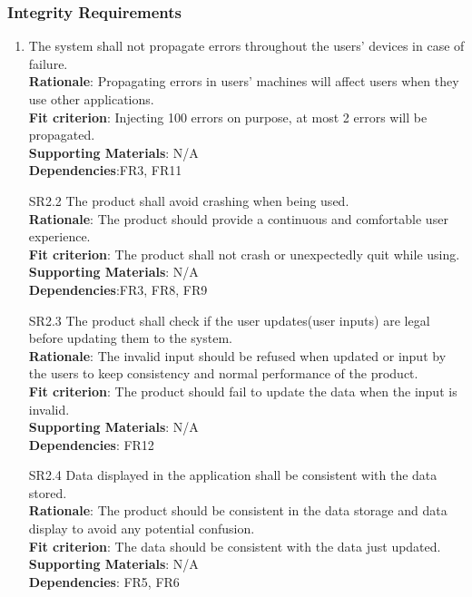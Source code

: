 \documentclass{article}
\begin{document}
\subsubsection{Integrity Requirements}
\begin{enumerate}[SR2.1]
    \item The system shall not propagate errors throughout the users' devices in case of failure.\\
    \textbf{Rationale}: Propagating errors in users' machines will affect
    users when they use other applications.\\
    \textbf{Fit criterion}: Injecting 100 errors on purpose, at most 2 errors
    will be propagated.\\
\textbf{Supporting Materials}: N/A\\
\textbf{Dependencies}:FR3, FR11\\

     \item[SR2.2] The product shall avoid crashing when
      being used.\\
      \textbf{Rationale}: The product should provide a continuous and comfortable user experience.\\
     \textbf{Fit criterion}: The product shall not crash or 
     unexpectedly quit while using.\\
\textbf{Supporting Materials}: N/A\\
\textbf{Dependencies}:FR3, FR8, FR9\\

    \item[SR2.3] The product shall check if the user
    updates(user inputs) are legal before updating them to the system.\\
    \textbf{Rationale}: The invalid input should be refused when updated or input by the users to keep consistency and normal performance of the product.\\
     \textbf{Fit criterion}: The product should fail to update the data when the input is invalid.\\
\textbf{Supporting Materials}: N/A\\
\textbf{Dependencies}: FR12\\

    \item[SR2.4] Data displayed in the application shall
     be consistent with the data stored.\\
     \textbf{Rationale}: The product should be consistent in the data storage and data display to avoid any potential confusion.\\
     \textbf{Fit criterion}: The data should be consistent with the data just updated.\\
\textbf{Supporting Materials}: N/A\\
\textbf{Dependencies}: FR5, FR6\\


\end{enumerate}
\end{document}
